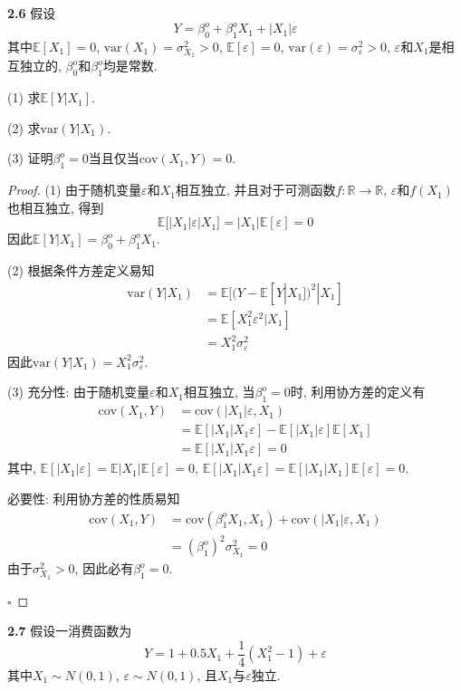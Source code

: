 \documentclass[cn,12pt,math=mtpro2,citestyle=gb7714-2015,bibstyle=gb7714-2015,twocol,mode=simple]{elegantbook}
\newcommand{\E}{\mathbb{E}}
\newcommand{\var}{\text{var}}
\begin{document}
\textbf{2.6} 假设
$$Y=\beta_0^o+\beta_1^oX_1+|X_1|\varepsilon$$
其中$\E[X_1]=0$, $\var(X_1)=\sigma^2_{X_1}>0$, $\E[\varepsilon]=0$, $\var(\varepsilon)=\sigma^2_{\varepsilon}>0$, $\varepsilon$和$X_1$是相互独立的, $\beta_0^o$和$\beta_1^o$均是常数.

(1) 求$\E[Y|X_1]$.

(2) 求$\var(Y|X_1)$.

(3) 证明$\beta_1^o=0$当且仅当$\text{cov}(X_1, Y)=0$.

\begin{proof}
  (1) 由于随机变量$\varepsilon$和$X_1$相互独立, 并且对于可测函数$f: \mathbb{R}\rightarrow\mathbb{R}$, $\varepsilon$和$f(X_1)$也相互独立, 得到
  $$\E[|X_1|\varepsilon|X_1]=|X_1|\E[\varepsilon]=0$$
  因此$\E[Y|X_1]=\beta_0^o+\beta_1^oX_1$.

  (2) 根据条件方差定义易知
  \begin{align}
  \var(Y|X_1)&=\E[(Y-\E[Y|X_1])^2|X_1] \nonumber \\
  &=\E[X_1^2\varepsilon^2|X_1] \nonumber \\
  &=X_1^2\sigma^2_{\varepsilon} \nonumber
  \end{align}
  因此$\var(Y|X_1)=X_1^2\sigma_{\varepsilon}^2$.

  (3) 充分性: 由于随机变量$\varepsilon$和$X_1$相互独立,  当$\beta_1^o=0$时, 利用协方差的定义有
  \begin{align}
  \text{cov}(X_1, Y)&=\text{cov}(|X_1|\varepsilon, X_1) \nonumber \\
  &=\E[|X_1|X_1\varepsilon]-\E[|X_1|\varepsilon]\E[X_1] \nonumber \\
  &=\E[|X_1|X_1\varepsilon]=0 \nonumber
  \end{align}
  其中, $\E[|X_1|\varepsilon]=\E|X_1|\E[\varepsilon]=0$, $\E[|X_1|X_1\varepsilon]=\E[|X_1|X_1]\E[\varepsilon]=0$.

  必要性: 利用协方差的性质易知
  \begin{align}
  \text{cov}(X_1,Y)&=\text{cov}(\beta_1^oX_1,X_1)+\text{cov}(|X_1|\varepsilon,X_1) \nonumber \\
  &=(\beta_1^o)^2\sigma^2_{X_1}=0 \nonumber
  \end{align}
  由于$\sigma_{X_1}^2>0$, 因此必有$\beta_1^o=0$.

  $\square$
\end{proof}


\textbf{2.7} 假设一消费函数为
$$Y=1+0.5X_1+\frac{1}{4}(X_1^2-1)+\varepsilon$$
其中$X_1 \sim N(0,1)$, $\varepsilon\sim N(0,1)$, 且$X_1$与$\varepsilon$独立.
\end{document}

